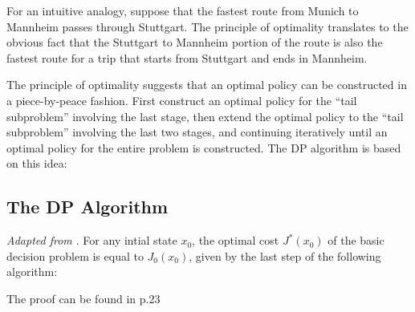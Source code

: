 For an intuitive analogy, suppose that the fastest route from Munich to Mannheim
passes through Stuttgart. The principle of optimality translates to the obvious
fact that the Stuttgart to Mannheim portion of the route is also the fastest
route for a trip that starts from Stuttgart and ends in Mannheim.

The principle of optimality suggests that an optimal policy can be constructed
in a piece-by-peace fashion. First construct an optimal policy for the ``tail
subproblem'' involving the last stage, then extend the optimal policy to the
``tail subproblem'' involving the last two stages, and continuing iteratively
until an optimal policy for the entire problem is constructed. The DP algorithm
is based on this idea:

\subsection*{The DP Algorithm} \label{sec:DPalgorithm}

\textit{Adapted from \cite{bertsekas1995dynamic}}. For any intial state $x_0$,
the optimal cost $J^*(x_0)$ of the basic decision problem is equal to
$J_0(x_0)$, given by the last step of the following algorithm: 


\begin{center}
\end{center}

The proof can be found in \cite{bertsekas1995dynamic} p.23
